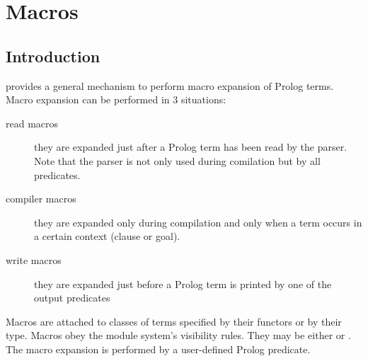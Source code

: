 %
% 
% 
% 
% 
%
%
%

\chapter{{\eclipse} Macros}
\label{chapmacros}

\section{Introduction}
{\eclipse} provides a general mechanism to perform macro expansion
of Prolog terms.
Macro expansion can be performed in 3 situations:
\begin{description}

\item[read macros]
they are expanded just after a Prolog term has been read by the
{\eclipse} parser. Note that the parser is not only used during
comilation but by all
predicates.

\item[compiler macros]
they are expanded only during compilation and only when a term occurs
in a certain context (clause or goal).

\item[write macros]
they are expanded just before a Prolog term is printed by one of the
output predicates

\end{description}
Macros are attached to classes of terms specified by their functors
or by their type.
Macros obey the module system's visibility rules.
They may be either
or
.
The macro expansion is performed by a user-defined Prolog predicate.


